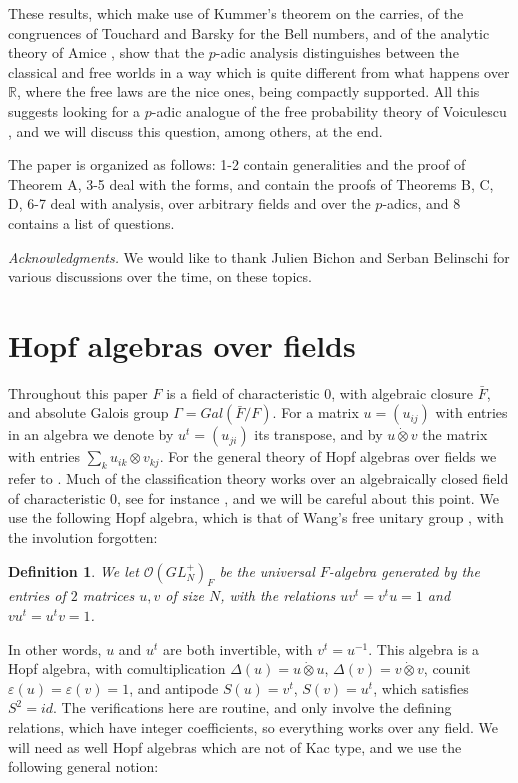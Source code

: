 \documentclass[11pt]{amsart}
\newtheorem{definition}[theorem]{Definition}
\theoremstyle{definition}
\begin{document}
These results, which make use of Kummer's theorem on the carries, of the congruences of Touchard and Barsky \cite{bar,tou} for the Bell numbers, and of the analytic theory of Amice \cite{ama}, show that the $p$-adic analysis distinguishes between the classical and free worlds in a way which is quite different from what happens over $\mathbb R$, where the free laws are the nice ones, being compactly supported. All this suggests looking for a $p$-adic analogue of the free probability theory of Voiculescu \cite{vdn}, and we will discuss this question, among others, at the end.

The paper is organized as follows: 1-2 contain generalities and the proof of Theorem A, 3-5 deal with the forms, and contain the proofs of Theorems B, C, D, 6-7 deal with analysis, over arbitrary fields and over the $p$-adics, and 8 contains a list of questions.

\medskip

{\em Acknowledgments.} We would like to thank Julien Bichon and Serban Belinschi for various discussions over the time, on these topics.

\section{Hopf algebras over fields}

Throughout this paper $F$ is a field of characteristic 0, with algebraic closure $\bar F$, and absolute Galois group $\Gamma=Gal(\bar F/F)$. For a matrix $u=(u_{ij})$ with entries in an algebra we denote by $u^t=(u_{ji})$ its transpose, and by $u\dot\otimes v$ the matrix with entries $\sum_ku_{ik}\otimes v_{kj}$. For the general theory of Hopf algebras over fields we refer to \cite{and,swe}. Much of the classification theory works over an algebraically closed field of characteristic 0, see for instance \cite{asc,bic,nat}, and we will be careful about this point. We use the following Hopf algebra, which is that of Wang's free unitary group \cite{wan}, with the involution forgotten:

\begin{definition}
We let $\mathcal O(GL_N^+)_F$ be the universal $F$-algebra generated by the entries of $2$ matrices $u,v$ of size $N$, with the relations $uv^t=v^tu=1$ and $vu^t=u^tv=1$.
\end{definition}

In other words, $u$ and $u^t$ are both invertible, with $v^t=u^{-1}$. This algebra is a Hopf algebra, with comultiplication $\Delta(u)=u\dot\otimes u$, $\Delta(v)=v\dot\otimes v$, counit $\varepsilon(u)=\varepsilon(v)=1$, and antipode $S(u)=v^t$, $S(v)=u^t$, which satisfies $S^2=id$. The verifications here are routine, and only involve the defining relations, which have integer coefficients, so everything works over any field. We will need as well Hopf algebras which are not of Kac type, and we use the following general notion:
\end{document}
